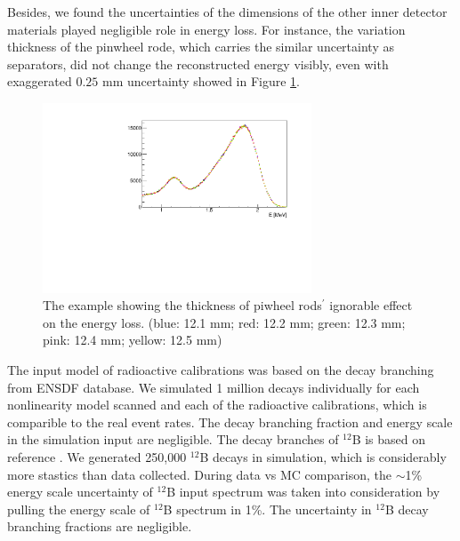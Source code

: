 Besides, we found the uncertainties of the dimensions of the other inner detector materials played negligible role in energy loss. 
For instance, the variation thickness of the pinwheel rode, which carries the similar uncertainty as separators, did not change the reconstructed energy visibly, even with exaggerated $0.25$ mm uncertainty showed in Figure \ref{fig:pinwheelthick}.

\begin{figure}[h!]
\centering
\includegraphics[width=80mm]{Figures/pinwheelthick.pdf}
\caption{The example showing the thickness of piwheel rods$^\prime$ ignorable effect on the energy loss. (blue: 12.1 mm; red: 12.2 mm; green: 12.3 mm; pink: 12.4 mm; yellow: 12.5 mm)}
\label{fig:pinwheelthick}
\end{figure}

The input model of radioactive calibrations was based on the decay branching from ENSDF database.
We simulated 1 million decays individually for each nonlinearity model scanned and each of the radioactive calibrations, which is comparible to the real event rates.
The decay branching fraction and energy scale in the simulation input are negligible.
The decay branches of $^{12}$B is based on reference \cite{bib:duke}. 
We generated 250,000 $^{12}$B decays in simulation, which is considerably more stastics than data collected.
During data vs MC comparison, the $\sim$1\% energy scale uncertainty of $^{12}$B input spectrum was taken into consideration by pulling the energy scale of $^{12}$B spectrum in 1\%. 
The uncertainty in $^{12}$B decay branching fractions are negligible.

